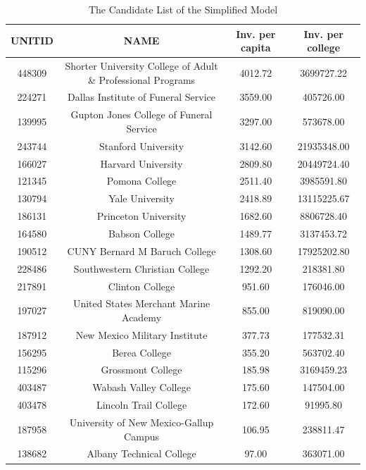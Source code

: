 \documentclass{mcmthesis}
\begin{document}
\begin{appendices}

\begin{table}
\caption{The Candidate List of the Simplified Model}
\begin{tabular}{c c c c}
\hline
UNITID & NAME & Inv. per capita & Inv. per college\\
\hline
448309 &  Shorter University College of Adult \& Professional Programs & 4012.72 & 3699727.22\\
224271 &                          Dallas Institute of Funeral Service & 3559.00 & 405726.00\\
139995 &                      Gupton Jones College of Funeral Service & 3297.00 & 573678.00\\
243744 &                                          Stanford University & 3142.60 & 21935348.00\\
166027 &                                           Harvard University & 2809.80 & 20449724.40\\
121345 &                                               Pomona College & 2511.40 & 3985591.80\\
130794 &                                              Yale University & 2418.89 & 13115225.67\\
186131 &                                         Princeton University & 1682.60 & 8806728.40\\
164580 &                                               Babson College & 1489.77 & 3137453.72\\
190512 &                                CUNY Bernard M Baruch College & 1308.60 & 17925202.80\\
228486 &                               Southwestern Christian College & 1292.20 & 218381.80\\
217891 &                                              Clinton College & 951.60 & 176046.00\\
197027 &                        United States Merchant Marine Academy & 855.00 & 819090.00\\
187912 &                                New Mexico Military Institute & 377.73 & 177532.31\\
156295 &                                                Berea College & 355.20 & 563702.40\\
115296 &                                            Grossmont College & 185.98 & 3169459.23\\
403487 &                                        Wabash Valley College & 175.60 & 147504.00\\
403478 &                                        Lincoln Trail College & 172.60 & 91995.80\\
187958 &                       University of New Mexico-Gallup Campus & 106.95 & 238811.47\\
138682 &                                     Albany Technical College & 97.00 & 363071.00\\
\hline
\end{tabular}
\end{table}


\end{appendices}
\end{document}
